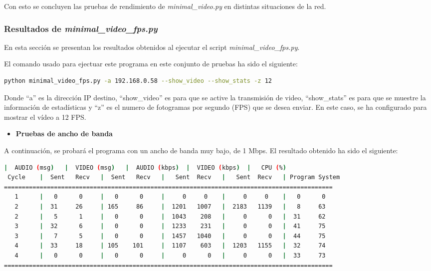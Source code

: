 Con esto se concluyen las pruebas de rendimiento de \textit{minimal\_video.py} en distintas situaciones de la red.

\newpage

\subsubsection{Resultados de \textit{minimal\_video\_fps.py}}
En esta sección se presentan los resultados obtenidos al ejecutar el script \textit{minimal\_video\_fps.py}.
\vspace{\baselineskip}

El comando usado para ejectuar este programa en este conjunto de pruebas ha sido el siguiente:

\begin{lstlisting}[language=bash, basicstyle=\ttfamily\scriptsize]
    python minimal_video_fps.py -a 192.168.0.58 --show_video --show_stats -z 12
\end{lstlisting}

Donde ``a'' es la dirección IP destino, ``show\_video'' es para que se active la transmisión de video, ``show\_stats'' es para que se muestre la información de estadísticas y ``z'' es el numero de fotogramas por segundo (FPS) que se desea enviar. En este caso, se ha configurado para mostrar el vídeo a 12 FPS.

\begin{itemize}
    \item \textbf{Pruebas de ancho de banda}
\end{itemize}

A continuación, se probará el programa con un ancho de banda muy bajo, de 1 Mbps. El resultado obtenido ha sido el siguiente:
\vspace{\baselineskip}

\begin{adjustbox}{max width=\textwidth}
\begin{lstlisting}[language=bash,basicstyle=\ttfamily\scriptsize]
          |  AUDIO (msg)   |  VIDEO (msg)   |  AUDIO (kbps)  |  VIDEO (kbps)  |   CPU (%)
 Cycle    |  Sent   Recv   |  Sent   Recv   |   Sent  Recv   |   Sent  Recv   | Program System
============================================================================================
   1      |   0      0     |   0      0     |     0     0    |     0     0    |   0      0
   2      |  31     26     | 165     86     |  1201   1007   |  2183   1139   |   8     63
   2      |   5      1     |   0      0     |  1043    208   |     0      0   |  31     62
   3      |  32      6     |   0      0     |  1233    231   |     0      0   |  41     75
   3      |   7      5     |   0      0     |  1457   1040   |     0      0   |  44     75
   4      |  33     18     | 105    101     |  1107    603   |  1203   1155   |  32     74
   4      |   0      0     |   0      0     |     0      0   |     0      0   |  33     73
============================================================================================
\end{lstlisting}
\end{adjustbox}

